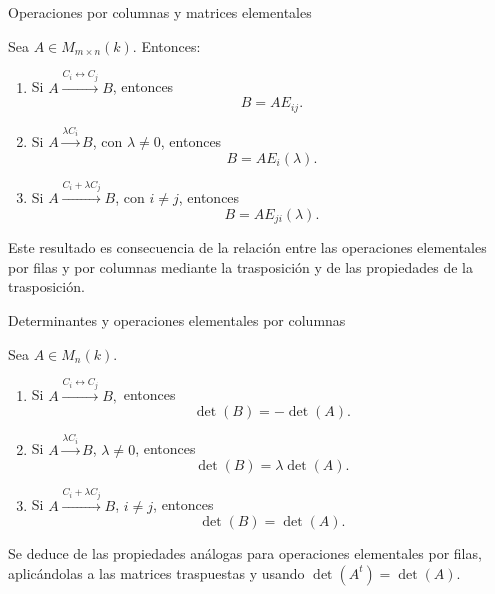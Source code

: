 \begin{frame}{Operaciones por columnas y matrices elementales}

\begin{theorem}
Sea \(A\in M_{m\times n}(k)\). Entonces:

\begin{enumerate}
\item Si \(A\xrightarrow{C_i\leftrightarrow C_j}B\), entonces
\[
B=AE_{ij}.
\]

\item Si \(A\xrightarrow{\lambda C_i}B\), con \(\lambda\neq0\), entonces
\[
B=AE_i(\lambda).
\]

\item Si \(A\xrightarrow{C_i+\lambda C_j}B\), con \(i\neq j\), entonces
\[
B=AE_{ji}(\lambda).
\]
\end{enumerate}
\end{theorem}

\vspace{-10pt}

Este resultado es consecuencia de la relación entre las operaciones elementales por filas y por columnas mediante la trasposición y de las propiedades de la trasposición.

\end{frame}

\begin{frame}{Determinantes y operaciones elementales por columnas}

\begin{theorem}
Sea \(A\in M_n(k)\).

\begin{enumerate}
\item Si
\(
A\xrightarrow{C_i\leftrightarrow C_j}B,
\)
entonces
\[
\det(B)=-\det(A).
\]

\item Si
\(
A\xrightarrow{\lambda C_i}B\),
\(\lambda\neq0\),
entonces
\[
\det(B)=\lambda\det(A).
\]

\item Si
\(
A\xrightarrow{C_i+\lambda C_j}B\),
\(i\neq j\),
entonces
\[
\det(B)=\det(A).
\]
\end{enumerate}
\end{theorem}

\vspace{-10pt}

Se deduce de las propiedades análogas para operaciones elementales
por filas, aplicándolas a las matrices traspuestas y usando
\(
\det(A^t)=\det(A).
\)

\end{frame}


